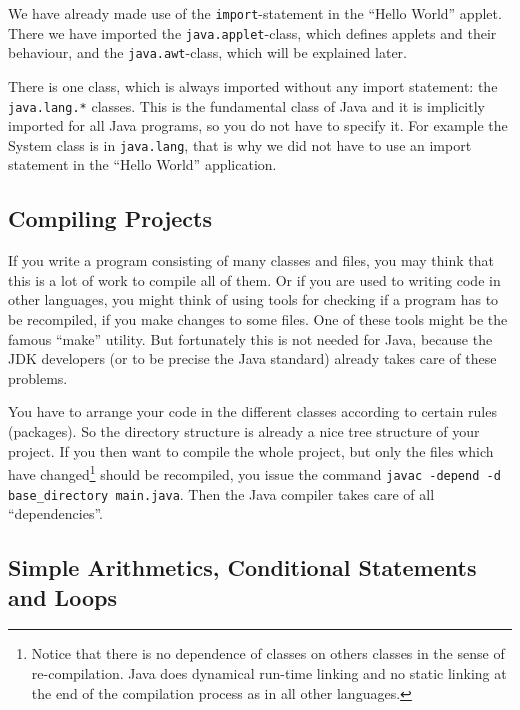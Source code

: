 We have already made use of the \verb|import|-statement in the ``Hello World'' 
applet. There we have imported the \verb|java.applet|-class, which
defines applets and their behaviour, and the \verb|java.awt|-class, which
will be explained later.
 
There is one class, which is always imported without any import statement:
the \verb|java.lang.*| classes. This is the fundamental class of Java and it is
implicitly imported for all Java programs, so you do not have to specify
it. For example the System class is in \verb|java.lang|, that is why
we did not have to use an import statement in the ``Hello World''
application.  


\subsection{Compiling Projects}
If you write a program consisting of many classes and files, you
may think that this is a lot of work to compile all of them. Or if
you are used to writing code in other languages, you might think
of using tools for checking if a program has to be recompiled, if you make
changes to some files. One of these tools might be the famous ``make''
utility. But fortunately this is not needed for Java, because
the JDK developers (or to be precise the Java standard) already
takes care of these problems. 

You have to arrange your code in the different classes according to 
certain rules (packages). So the directory structure is already a
nice tree structure of your project. If you then want to compile
the whole project, but only the files which have changed\footnote{Notice
that there is no dependence of classes on others classes in the
sense of re-compilation. Java does dynamical run-time linking and no static 
linking at the end of the compilation process as in all other languages.}
should be recompiled, you issue the
command \verb|javac -depend -d base_directory main.java|. Then
the Java compiler takes care of all ``dependencies''.   

\subsection{Simple Arithmetics, Conditional Statements and Loops}
\label{sec:Loops}


